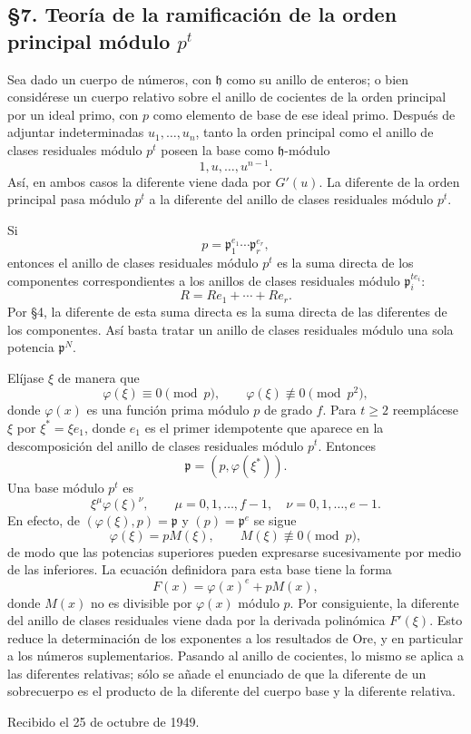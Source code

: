 \subsection*{§7. Teoría de la ramificación de la orden principal módulo $p^t$}

Sea dado un cuerpo de números, con $\mathfrak h$ como su anillo de enteros; o bien considérese un cuerpo relativo sobre el anillo de cocientes de la orden principal por un ideal primo, con $p$ como elemento de base de ese ideal primo. Después de adjuntar indeterminadas $u_1,\ldots,u_n$, tanto la orden principal como el anillo de clases residuales módulo $p^t$ poseen la base como $\mathfrak h$-módulo
\[
        1,u,\ldots,u^{n-1}.
\]
Así, en ambos casos la diferente viene dada por $G'(u)$. La diferente de la orden principal pasa módulo $p^t$ a la diferente del anillo de clases residuales módulo $p^t$.

Si
\[
        p=\mathfrak p_1^{e_1}\cdots\mathfrak p_r^{e_r},
\]
entonces el anillo de clases residuales módulo $p^t$ es la suma directa de los componentes correspondientes a los anillos de clases residuales módulo $\mathfrak p_i^{te_i}$:
\[
        R=Re_1+\cdots+Re_r.
\]
Por §4, la diferente de esta suma directa es la suma directa de las diferentes de los componentes. Así basta tratar un anillo de clases residuales módulo una sola potencia $\mathfrak p^N$.

Elíjase $\xi$ de manera que
\[
        \varphi(\xi)\equiv0\pmod p,
        \qquad
        \varphi(\xi)\not\equiv0\pmod {p^2},
\]
donde $\varphi(x)$ es una función prima módulo $p$ de grado $f$. Para $t\ge2$ reemplácese $\xi$ por $\xi^*=\xi e_1$, donde $e_1$ es el primer idempotente que aparece en la descomposición del anillo de clases residuales módulo $p^t$. Entonces
\[
        \mathfrak p=(p,\varphi(\xi^*)).
\]
Una base módulo $p^t$ es
\[
        \xi^{\mu}\varphi(\xi)^{\nu},
        \qquad
        \mu=0,1,\ldots,f-1,
        \quad
        \nu=0,1,\ldots,e-1.
\]
En efecto, de $(\varphi(\xi),p)=\mathfrak p$ y $(p)=\mathfrak p^e$ se sigue
\[
        \varphi(\xi)=pM(\xi),
        \qquad M(\xi)\not\equiv0\pmod p,
\]
de modo que las potencias superiores pueden expresarse sucesivamente por medio de las inferiores. La ecuación definidora para esta base tiene la forma
\[
        F(x)=\varphi(x)^e+pM(x),
\]
donde $M(x)$ no es divisible por $\varphi(x)$ módulo $p$. Por consiguiente, la diferente del anillo de clases residuales viene dada por la derivada polinómica $F'(\xi)$. Esto reduce la determinación de los exponentes a los resultados de Ore, y en particular a los números suplementarios. Pasando al anillo de cocientes, lo mismo se aplica a las diferentes relativas; sólo se añade el enunciado de que la diferente de un sobrecuerpo es el producto de la diferente del cuerpo base y la diferente relativa.

\begin{center}
Recibido el 25 de octubre de 1949.
\end{center}
